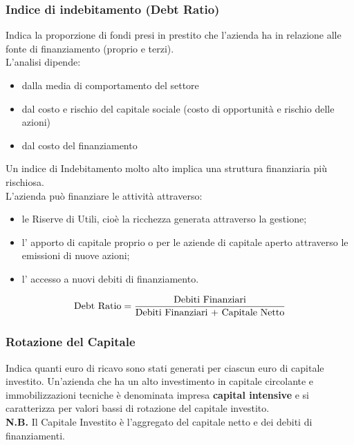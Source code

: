 \documentclass{article}
\begin{document}
\subsubsection{Indice di indebitamento (Debt Ratio)}
Indica la proporzione di fondi presi in prestito che l'azienda ha in
relazione alle fonte di finanziamento (proprio e terzi).\\
L'analisi dipende:
\begin{itemize}
    \item dalla media di comportamento del settore
    \item dal costo e rischio del capitale sociale (costo di opportunità e rischio delle azioni)
    \item dal costo del finanziamento
\end{itemize}
Un indice di Indebitamento molto alto implica una struttura finanziaria più rischiosa.
\vspace*{0.2cm}\\
L'azienda può finanziare le attività attraverso:
\begin{itemize}
    \item le Riserve di Utili, cioè la ricchezza generata attraverso la gestione;
    \item l' apporto di capitale proprio o per le aziende di capitale aperto attraverso le emissioni di nuove azioni;
    \item l' accesso a nuovi debiti di finanziamento.
\end{itemize}
\[
    \text{Debt Ratio} = \frac{\text{Debiti Finanziari}}{\text{Debiti Finanziari + Capitale Netto}}
\]


\subsubsection{Rotazione del Capitale}
Indica quanti euro di ricavo sono stati generati per ciascun euro di capitale investito. Un'azienda che ha un alto investimento in capitale circolante e immobilizzazioni tecniche è denominata impresa \textbf{capital intensive} e si caratterizza per valori bassi di rotazione del capitale investito.\\
\textbf{N.B.} Il Capitale Investito è l'aggregato del capitale netto e dei debiti di finanziamenti.
\end{document}
